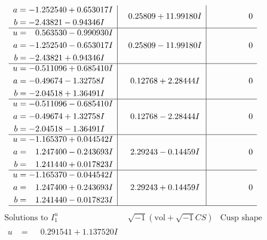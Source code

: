 \documentclass[1p]{elsarticle_modified}
\theoremstyle{definition}
\newcommand{\I}{\sqrt{-1}}
\begin{document}
$$\begin{array}{c|c|c}
\begin{aligned}
a &= -1.252540 + 0.653017 I \\
b &= -2.43821 - 0.94346 I\end{aligned}
 & \phantom{-}0.25809 + 11.99180 I & \phantom{-0.000000 } 0 \\ \hline\begin{aligned}
u &= \phantom{-}0.563530 - 0.990930 I \\
a &= -1.252540 - 0.653017 I \\
b &= -2.43821 + 0.94346 I\end{aligned}
 & \phantom{-}0.25809 - 11.99180 I & \phantom{-0.000000 } 0 \\ \hline\begin{aligned}
u &= -0.511096 + 0.685410 I \\
a &= -0.49674 - 1.32758 I \\
b &= -2.04518 + 1.36491 I\end{aligned}
 & \phantom{-}0.12768 + 2.28444 I & \phantom{-0.000000 } 0 \\ \hline\begin{aligned}
u &= -0.511096 - 0.685410 I \\
a &= -0.49674 + 1.32758 I \\
b &= -2.04518 - 1.36491 I\end{aligned}
 & \phantom{-}0.12768 - 2.28444 I & \phantom{-0.000000 } 0 \\ \hline\begin{aligned}
u &= -1.165370 + 0.044542 I \\
a &= \phantom{-}1.247400 - 0.243693 I \\
b &= \phantom{-}1.241440 + 0.017823 I\end{aligned}
 & \phantom{-}2.29243 - 0.14459 I & \phantom{-0.000000 } 0 \\ \hline\begin{aligned}
u &= -1.165370 - 0.044542 I \\
a &= \phantom{-}1.247400 + 0.243693 I \\
b &= \phantom{-}1.241440 - 0.017823 I\end{aligned}
 & \phantom{-}2.29243 + 0.14459 I & \phantom{-0.000000 } 0\\
 \hline 
 \end{array}$$\newpage$$\begin{array}{c|c|c}  
\text{Solutions to }I^u_{1}& \I (\text{vol} + \sqrt{-1}CS) & \text{Cusp shape}\\
 \hline 
\begin{aligned}
u &= \phantom{-}0.291541 + 1.137520 I \\

\end{aligned}
\end{array}$$
\end{document}

